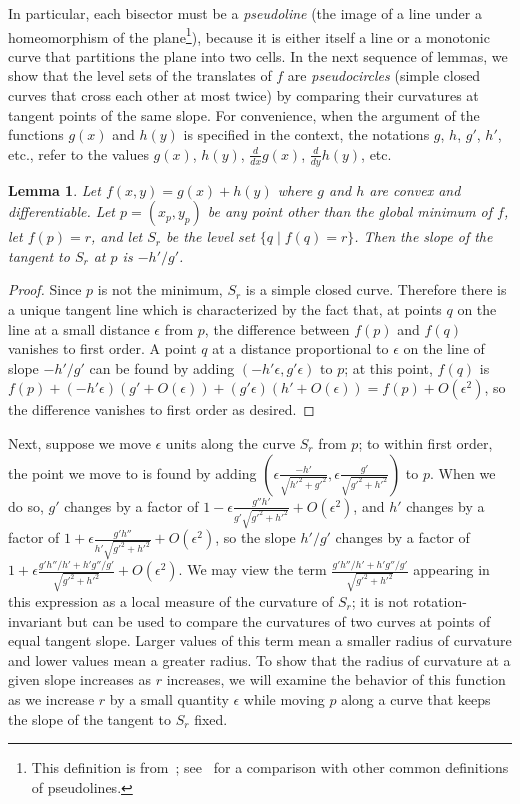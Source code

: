 \documentclass[10pt, conference, compsocconf]{IEEEtran}
\newtheorem{lemma}[theorem]{Lemma}
\begin{document}
In particular, each bisector must be a \emph{pseudoline} (the image of a line under a homeomorphism of the plane\footnote{This definition is from~\cite{Sho-VKF-91}; see~\cite{EppFalOvc-07} for a comparison with other common definitions of pseudolines.}), because it is either itself a line or a monotonic curve that partitions the plane into two cells. In the next sequence of lemmas, we show that the level sets of the translates of $f$ are \emph{pseudocircles} (simple closed curves that cross each other at most twice) by comparing their curvatures at tangent points of the same slope. For convenience, when the argument of the functions $g(x)$ and $h(y)$ is specified in the context, the notations $g$, $h$, $g'$, $h'$, etc., refer to the values $g(x)$, $h(y)$, $\frac{d}{dx}g(x)$, $\frac{d}{dy}h(y)$, etc.

\begin{lemma}
Let $f(x,y)=g(x)+h(y)$ where $g$ and $h$ are convex and differentiable.
Let  $p=(x_p,y_p)$ be any point other than the global minimum of $f$, let $f(p)=r$, and let $S_r$ be the level set $\{q\mid f(q)=r\}$.
Then the slope of the tangent to $S_r$ at $p$ is $-h'/g'$.
\end{lemma}

\begin{proof}
Since $p$ is not the minimum, $S_r$ is a simple closed curve.
Therefore there is a unique tangent line which is characterized by the fact that, at points $q$ on the line at a small distance $\epsilon$ from $p$, the difference between $f(p)$ and $f(q)$ vanishes to first order. A point $q$ at a distance proportional to $\epsilon$ on the line of slope $-h'/g'$ can be found by adding $(-h'\epsilon,g'\epsilon)$ to $p$; at this point, $f(q)$ is $f(p)+(-h'\epsilon)(g'+O(\epsilon))+(g'\epsilon)(h'+O(\epsilon))=f(p)+O(\epsilon^2)$, so the difference vanishes to first order as desired.
\end{proof}

Next, suppose we move $\epsilon$ units along the curve $S_r$ from $p$; to within
first order, the point we move to is found by adding
$(\epsilon\frac{-h'}{\sqrt{h'^2+g'^2}},\epsilon\frac{g'}{\sqrt{g'^2+h'^2}})$ to $p$. When we do so, $g'$
changes by a factor of
$1-\epsilon\frac{g''h'}{g'\sqrt{g'^2+h'^2}}+O(\epsilon^2)$,
and $h'$ changes by a factor of $1+ \epsilon\frac{g'h''}{h'\sqrt{g'^2+h'^2}}+O(\epsilon^2)$, so the slope $h'/g'$
changes by a factor of $1+\epsilon\frac{g'h''/h' +
h'g''/g'}{\sqrt{g'^2+h'^2}}+O(\epsilon^2)$. We may view the term $\frac{g'h''/h' +
h'g''/g'}{\sqrt{g'^2+h'^2}}$ appearing in this expression as a local measure of the
curvature of $S_r$; it is not rotation-invariant but can be used to compare
the curvatures of two curves at points of equal tangent slope. Larger
values of this term mean a smaller radius of curvature and lower values mean a greater
radius. To show that the radius of curvature at a given slope increases as $r$ increases, we will examine the behavior of this function as we increase $r$ by a small quantity $\epsilon$ while moving $p$ along a curve that keeps the slope of the tangent to $S_r$ fixed.
\end{document}
